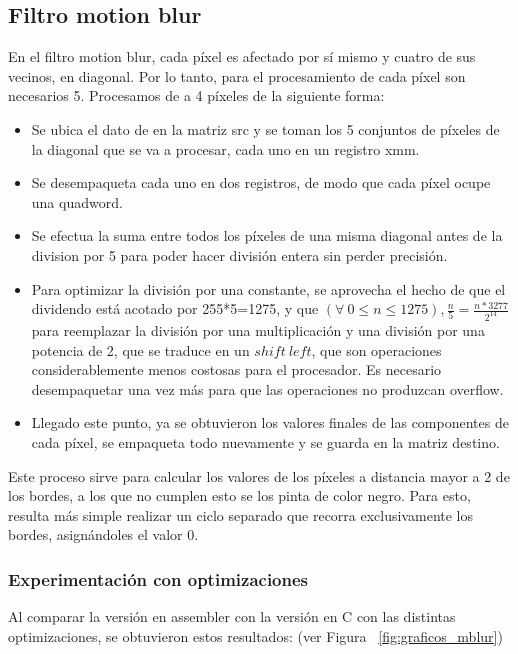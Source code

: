 \documentclass[a4paper]{article}
\begin{document}
\subsection{Filtro motion blur}
En el filtro motion blur, cada píxel es afectado por sí mismo y cuatro de sus vecinos, en diagonal. Por lo tanto, para el procesamiento de cada píxel son necesarios 5. Procesamos de a 4 píxeles de la siguiente forma:
\begin{itemize}
\item Se ubica el dato de en la matriz src y se toman los 5 conjuntos de píxeles de la diagonal que se va a procesar, cada uno en un registro xmm.
\item Se desempaqueta cada uno en dos registros, de modo que cada píxel ocupe una quadword.
\item Se efectua la suma entre todos los píxeles de una misma diagonal antes de la division por 5 para poder hacer división entera sin perder precisión.
\item Para optimizar la división por una constante, se aprovecha el hecho de que el dividendo está acotado por 255*5=1275, y que $(\forall\ 0 \leq n \leq 1275), \frac{n}{5}=\frac{n*3277}{2^{14}} $ %
para reemplazar la división por una multiplicación y una división por una potencia de 2, que se traduce en un $shift\ left$, que son operaciones considerablemente menos costosas para el procesador. Es necesario desempaquetar una vez más para que las operaciones no produzcan overflow.
\item Llegado este punto, ya se obtuvieron los valores finales de las componentes de cada píxel, se empaqueta todo nuevamente y se guarda en la matriz destino.
\end{itemize}
Este proceso sirve para calcular los valores de los píxeles a distancia mayor a 2 de los bordes, a los que no cumplen esto se los pinta de color negro. Para esto, resulta más simple realizar un ciclo separado que recorra exclusivamente los bordes, asignándoles el valor 0.

\subsubsection{Experimentación con optimizaciones}

Al comparar la versión en assembler con la versión en C con las distintas optimizaciones, se obtuvieron estos resultados: (ver Figura ~\ref{fig:graficos_mblur})
\end{document}
